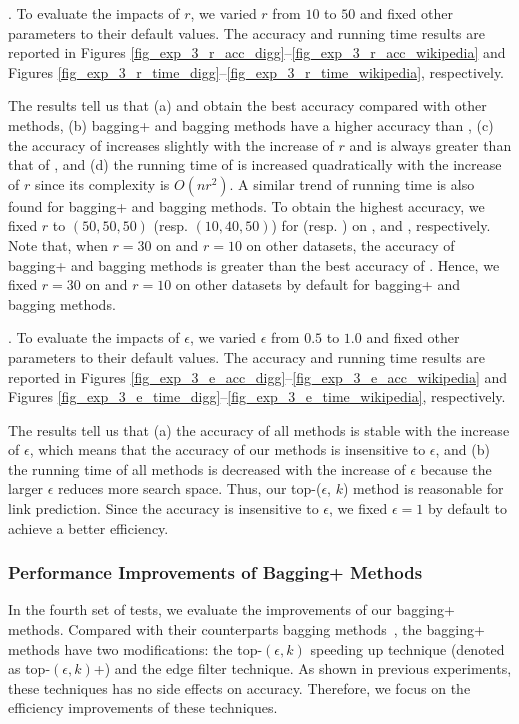 . To evaluate the impacts of $r$, we
varied $r$ from $10$ to $50$ and fixed other parameters to their
default values. The accuracy and running time results are reported in
Figures \ref{fig_exp_3_r_acc_digg}--\ref{fig_exp_3_r_acc_wikipedia} and 
Figures \ref{fig_exp_3_r_time_digg}--\ref{fig_exp_3_r_time_wikipedia}, respectively.


The results tell us that (a) \Biasedp and \Biased obtain the best accuracy
compared with other methods, (b) bagging+ and bagging methods have a higher accuracy
than \BIGCLAM, (c) the accuracy of \NMF increases slightly with the increase of $r$ and is always
greater than that of \BIGCLAM, and (d) the running time of \NMF is increased
quadratically with the increase of $r$ since its complexity is $O(nr^2)$.
A similar trend of running time is also found for bagging+ and bagging methods.
To obtain the highest accuracy, we fixed $r$ to $(50, 50, 50)$ (resp. $(10, 40, 50)$)
for \NMF (resp. \BIGCLAM) on \Digg, \YouTube and \Wikipedia, respectively.
Note that, when $r = 30$ on \Digg and $r = 10$ on other datasets, the accuracy
of bagging+ and bagging methods is greater than the best accuracy of \NMF. Hence, we
fixed $r = 30$ on \Digg and $r = 10$ on other datasets by default for bagging+ and bagging methods.






. To evaluate the impacts of $\epsilon$, we
varied $\epsilon$ from $0.5$ to $1.0$ and fixed other parameters to their
default values. The accuracy and running time results are reported in
Figures \ref{fig_exp_3_e_acc_digg}--\ref{fig_exp_3_e_acc_wikipedia} and 
Figures \ref{fig_exp_3_e_time_digg}--\ref{fig_exp_3_e_time_wikipedia}, respectively.



The results tell us that (a) the accuracy of all methods is stable with
the increase of $\epsilon$, which means that the accuracy of our methods is insensitive
to $\epsilon$, and (b) the running time of all methods is decreased with the increase of $\epsilon$
because the larger $\epsilon$ reduces more search space. Thus, our top-($\epsilon$, $k$)
method is reasonable for link prediction. Since the accuracy is insensitive to $\epsilon$, we
fixed $\epsilon = 1$ by default to achieve a better efficiency.





\subsubsection{Performance Improvements of Bagging+ Methods}
In the fourth set of tests, we evaluate the improvements of our bagging+ methods.
Compared with their counterparts bagging methods~\cite{liang2016}, the bagging+ methods have two modifications:
the top-$(\epsilon, k)$ speeding up technique (denoted as top-$(\epsilon, k)$+) and the edge filter technique.
As shown in previous experiments, these techniques has no side effects on accuracy.
Therefore, we focus on the efficiency improvements of these techniques.


